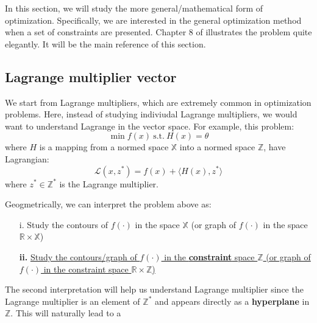 In this section, we will study the more general/mathematical form of optimization. Specifically, we are interested in the general optimization method when a set of constraints are presented.
Chapter 8 of \citet{luenberger1997optimization} illustrates the problem quite elegantly. It will be the main reference of this section.

\subsection{Lagrange multiplier vector}
We start from Lagrange multipliers, which are extremely common in optimization problems. Here, instead of studying indiviudal Lagrange multipliers, we would want to understand Lagrange in the vector space. For example, this problem:
$$\min f(x)\ \text{s.t.}\ H(x)=\theta$$
where $H$ is a mapping from a normed space $\mathbb{X}$ into a normed space $\mathbb{Z}$, have Lagrangian:
$$\mathcal{L}(x,z^*)=f(x)+\langle H(x),z^*\rangle$$
where $z^*\in \mathbb{Z}^*$ is the Lagrange multiplier. 

Geogmetrically, we can interpret the problem above as:
\begin{enumerate}
    \item[i.] Study the contours of $f(\cdot)$ in the space $\mathbb{X}$ (or graph of $f(\cdot)$ in the space $\mathbb{R}\times \mathbb{X}$)
    \item[\textbf{ii.}] \underline{Study the contours/graph of $f(\cdot)$ in the \textbf{constraint} space $\mathbb{Z}$ (or graph of $f(\cdot)$ in the constraint space $\mathbb{R}\times \mathbb{Z}$)}
\end{enumerate}

The second interpretation will help us understand Lagrange multiplier since the Lagrange multiplier is an element of $\mathbb{Z}^*$ and appears directly as a \textbf{hyperplane} in $\mathbb{Z}$.
This will naturally lead to a 